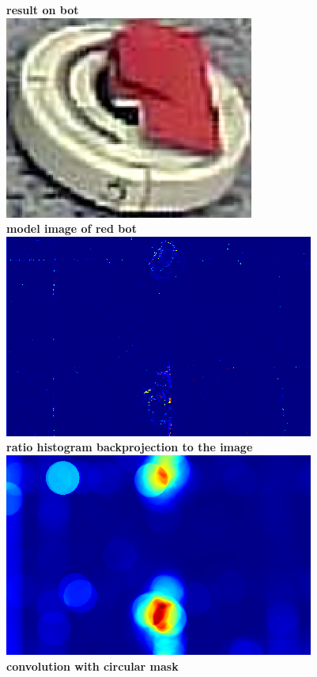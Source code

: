 \documentclass[letterpaper, 10 pt, conference]{ieeeconf}
\begin{document}
\textbf{result on bot }\\
\includegraphics[scale =0.30]{model.png}\\
\textbf{model image of red bot}\\

\includegraphics[scale =0.85 ]{backprojectonimage.png}\\
\textbf{ratio histogram backprojection to the image}\\

\includegraphics[scale =0.85 ]{convolutionwithcircularmask.png}\\
\textbf{convolution with circular mask}\\
\end{document}
